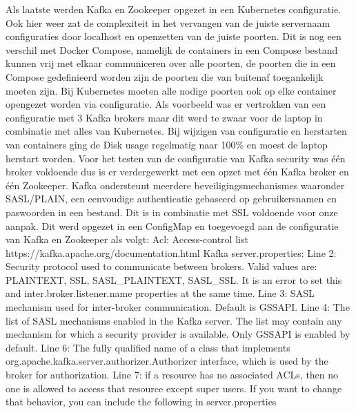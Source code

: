 Als laatste werden Kafka en Zookeeper opgezet in een Kubernetes configuratie. Ook hier weer zat de complexiteit in het vervangen van de juiste servernaam configuraties door localhost en openzetten van de juiste poorten.
Dit is nog een verschil met Docker Compose, namelijk de containers in een Compose bestand kunnen vrij met elkaar communiceren over alle poorten, de poorten die in een Compose gedefinieerd worden zijn de poorten die van buitenaf toegankelijk moeten zijn. Bij Kubernetes moeten alle nodige poorten ook op elke container opengezet worden via configuratie.
\newline
\newline
Als voorbeeld was er vertrokken van een configuratie met 3 Kafka brokers maar dit werd te zwaar voor de laptop in combinatie met alles van Kubernetes. Bij wijzigen van configuratie en herstarten van containers ging de Disk usage regelmatig naar 100\% en moest de laptop herstart worden. Voor het testen van de configuratie van Kafka security was \'e\'en broker voldoende dus is er verdergewerkt met een opzet met \'e\'en Kafka broker en \'e\'en Zookeeper. 
\newline
Kafka ondersteunt meerdere beveiligingsmechanismes waaronder SASL/PLAIN, een eenvoudige authenticatie gebaseerd op gebruikersnamen en paswoorden in een bestand. Dit is in combinatie met SSL voldoende voor onze aanpak.
\newline
Dit werd opgezet in een ConfigMap en toegevoegd aan de configuratie van Kafka en Zookeeper als volgt:
\newline
\newline
Acl: Access-control list
\newline
https://kafka.apache.org/documentation.html
\newline
Kafka server.properties:
Line 2: Security protocol used to communicate between brokers. Valid values are: PLAINTEXT, SSL, SASL\_PLAINTEXT, SASL\_SSL. It is an error to set this and inter.broker.listener.name properties at the same time.
Line 3: SASL mechanism used for inter-broker communication. Default is GSSAPI.
Line 4: The list of SASL mechanisms enabled in the Kafka server. The list may contain any mechanism for which a security provider is available. Only GSSAPI is enabled by default.
Line 6: The fully qualified name of a class that implements org.apache.kafka.server.authorizer.Authorizer interface, which is used by the broker for authorization.
Line 7: if a resource has no associated ACLs, then no one is allowed to access that resource except super users. If you want to change that behavior, you can include the following in server.properties
